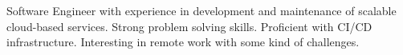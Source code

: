 

\begin{cvparagraph}


Software Engineer with experience in development and maintenance of scalable cloud-based services.
Strong problem solving skills. Proficient with CI/CD infrastructure. Interesting in remote work with some kind of challenges. 


\end{cvparagraph}
